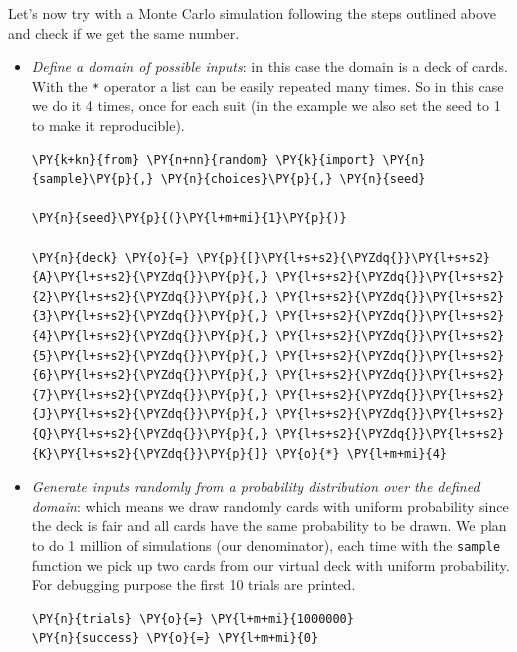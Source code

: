Let's now try with a Monte Carlo simulation following the steps outlined above and check if we get the same number.
\begin{itemize}
\item \emph{Define a domain of possible inputs}: in this case the domain is a deck of cards. With the \texttt{*} operator a list can be easily repeated many times. So in this case we do it 4 times, once for each suit (in the example we also set the seed to 1 to make
it reproducible).

\begin{tcolorbox}[breakable, size=fbox, boxrule=1pt, pad at break*=1mm,colback=cellbackground, colframe=cellborder]
\begin{Verbatim}[commandchars=\\\{\}]
\PY{k+kn}{from} \PY{n+nn}{random} \PY{k}{import} \PY{n}{sample}\PY{p}{,} \PY{n}{choices}\PY{p}{,} \PY{n}{seed}

\PY{n}{seed}\PY{p}{(}\PY{l+m+mi}{1}\PY{p}{)}

\PY{n}{deck} \PY{o}{=} \PY{p}{[}\PY{l+s+s2}{\PYZdq{}}\PY{l+s+s2}{A}\PY{l+s+s2}{\PYZdq{}}\PY{p}{,} \PY{l+s+s2}{\PYZdq{}}\PY{l+s+s2}{2}\PY{l+s+s2}{\PYZdq{}}\PY{p}{,} \PY{l+s+s2}{\PYZdq{}}\PY{l+s+s2}{3}\PY{l+s+s2}{\PYZdq{}}\PY{p}{,} \PY{l+s+s2}{\PYZdq{}}\PY{l+s+s2}{4}\PY{l+s+s2}{\PYZdq{}}\PY{p}{,} \PY{l+s+s2}{\PYZdq{}}\PY{l+s+s2}{5}\PY{l+s+s2}{\PYZdq{}}\PY{p}{,} \PY{l+s+s2}{\PYZdq{}}\PY{l+s+s2}{6}\PY{l+s+s2}{\PYZdq{}}\PY{p}{,} \PY{l+s+s2}{\PYZdq{}}\PY{l+s+s2}{7}\PY{l+s+s2}{\PYZdq{}}\PY{p}{,} \PY{l+s+s2}{\PYZdq{}}\PY{l+s+s2}{J}\PY{l+s+s2}{\PYZdq{}}\PY{p}{,} \PY{l+s+s2}{\PYZdq{}}\PY{l+s+s2}{Q}\PY{l+s+s2}{\PYZdq{}}\PY{p}{,} \PY{l+s+s2}{\PYZdq{}}\PY{l+s+s2}{K}\PY{l+s+s2}{\PYZdq{}}\PY{p}{]} \PY{o}{*} \PY{l+m+mi}{4}
 \end{Verbatim}
\end{tcolorbox}

\item \emph{Generate inputs randomly from a probability distribution over the defined domain}: which means we draw randomly cards with uniform probability since the deck is fair and all cards have the same probability to be drawn. 
We plan to do 1 million of simulations (our denominator), each time with the \texttt{sample} function we pick up two cards from our virtual deck with uniform probability. For debugging purpose the first 10 trials are printed.

\begin{tcolorbox}[breakable, size=fbox, boxrule=1pt, pad at break*=1mm,colback=cellbackground, colframe=cellborder]
\begin{Verbatim}[commandchars=\\\{\}]
\PY{n}{trials} \PY{o}{=} \PY{l+m+mi}{1000000}
\PY{n}{success} \PY{o}{=} \PY{l+m+mi}{0}


\end{Verbatim}
\end{tcolorbox}
\end{itemize}
